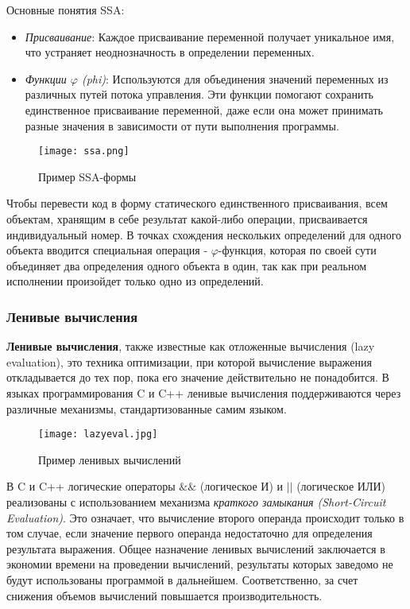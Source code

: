 Основные понятия SSA:
\begin{itemize}
    \item \textit{Присваивание}: Каждое присваивание переменной получает уникальное имя, что устраняет неоднозначность в определении переменных.
    \item \textit{Функции $\varphi$ (phi)}: Используются для объединения значений переменных из различных путей потока управления. Эти функции помогают сохранить единственное присваивание переменной, даже если она может принимать разные значения в зависимости от пути выполнения программы.
\end{itemize}

\begin{figure}[!htb]
    \centering
    \texttt{[image: ssa.png]}
    \caption{Пример SSA-формы}
\end{figure}

Чтобы перевести код в форму статического единственного присваивания, всем объектам, хранящим в себе результат какой-либо операции, присваивается индивидуальный номер. В точках схождения нескольких определений для одного объекта вводится специальная операция - $\varphi$-функция, которая по своей сути объединяет два определения одного объекта в один, так как при реальном исполнении  произойдет только одно из определений.

\subsubsection{Ленивые вычисления}

\textbf{Ленивые вычисления}, также известные как {отложенные вычисления (lazy evaluation)}, это техника оптимизации, при которой вычисление выражения откладывается до тех пор, пока его значение действительно не понадобится. В языках программирования C и C++ ленивые вычисления поддерживаются через различные механизмы, стандартизованные самим языком.

\begin{figure}[!htb]
    \centering
    \texttt{[image: lazyeval.jpg]}
    \caption{Пример ленивых вычислений}
    \label{lazyeval}
\end{figure}

В C и C++ логические операторы $\&\&$ (логическое И) и $||$ (логическое ИЛИ) реализованы с использованием механизма \textit{краткого замыкания (Short-Circuit Evaluation)}. Это означает, что вычисление второго операнда происходит только в том случае, если значение первого операнда недостаточно для определения результата выражения. Общее назначение ленивых вычислений заключается в экономии времени на проведении вычислений, результаты которых заведомо не будут использованы программой в дальнейшем. Соответственно, за счет снижения объемов вычислений повышается производительность. 

